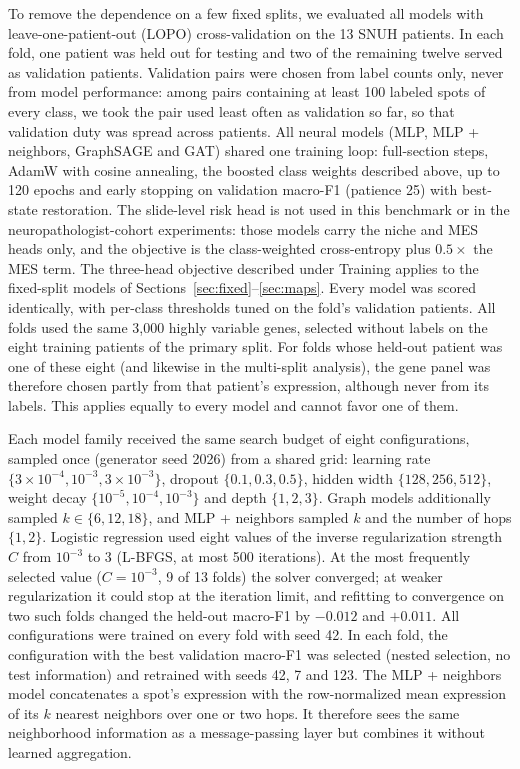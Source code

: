 \documentclass[11pt,letterpaper]{article}
\begin{document}
To remove the dependence on a few fixed splits, we evaluated all models with leave-one-patient-out (LOPO) cross-validation on the 13 SNUH patients. In each fold, one patient was held out for testing and two of the remaining twelve served as validation patients. Validation pairs were chosen from label counts only, never from model performance: among pairs containing at least 100 labeled spots of every class, we took the pair used least often as validation so far, so that validation duty was spread across patients. All neural models (MLP, MLP + neighbors, GraphSAGE and GAT) shared one training loop: full-section steps, AdamW with cosine annealing, the boosted class weights described above, up to 120 epochs and early stopping on validation macro-F1 (patience 25) with best-state restoration. The slide-level risk head is not used in this benchmark or in the neuropathologist-cohort experiments: those models carry the niche and MES heads only, and the objective is the class-weighted cross-entropy plus $0.5\times$ the MES term. The three-head objective described under Training applies to the fixed-split models of Sections~\ref{sec:fixed}--\ref{sec:maps}. Every model was scored identically, with per-class thresholds tuned on the fold's validation patients. All folds used the same 3{,}000 highly variable genes, selected without labels on the eight training patients of the primary split. For folds whose held-out patient was one of these eight (and likewise in the multi-split analysis), the gene panel was therefore chosen partly from that patient's expression, although never from its labels. This applies equally to every model and cannot favor one of them.

Each model family received the same search budget of eight configurations, sampled once (generator seed 2026) from a shared grid: learning rate $\{3 \times 10^{-4}, 10^{-3}, 3 \times 10^{-3}\}$, dropout $\{0.1, 0.3, 0.5\}$, hidden width $\{128, 256, 512\}$, weight decay $\{10^{-5}, 10^{-4}, 10^{-3}\}$ and depth $\{1, 2, 3\}$. Graph models additionally sampled $k \in \{6, 12, 18\}$, and MLP + neighbors sampled $k$ and the number of hops $\{1, 2\}$. Logistic regression used eight values of the inverse regularization strength $C$ from $10^{-3}$ to 3 (L-BFGS, at most 500 iterations). At the most frequently selected value ($C = 10^{-3}$, 9 of 13 folds) the solver converged; at weaker regularization it could stop at the iteration limit, and refitting to convergence on two such folds changed the held-out macro-F1 by $-0.012$ and $+0.011$. All configurations were trained on every fold with seed 42. In each fold, the configuration with the best validation macro-F1 was selected (nested selection, no test information) and retrained with seeds 42, 7 and 123. The MLP + neighbors model concatenates a spot's expression with the row-normalized mean expression of its $k$ nearest neighbors over one or two hops. It therefore sees the same neighborhood information as a message-passing layer but combines it without learned aggregation.
\end{document}
